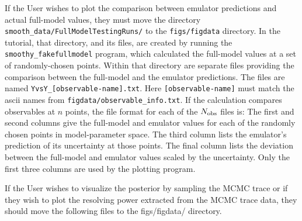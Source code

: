 \documentclass[UserManual.tex]{subfiles}
\begin{document}
\begin{sloppypar}
If the User wishes to plot the comparison between emulator predictions and actual full-model values, they must move the directory {\tt smooth\_data/FullModelTestingRuns/} to the {\tt figs/figdata} directory.
\vspace*{-8pt}{\tt
\begin{Verbatim}[commandchars=\\\{\}]
% \textcolor{darkred}{cp -r \textit{MY_ANALYSIS}/smooth_data/FullModelTestingRuns \textit{MY_ANALYSIS}/figs/figdata/}
\end{Verbatim}
}\vspace*{-8pt}
In the tutorial, that directory, and its files, are created by running  the {\tt smoothy\_fakefullmodel} program, which calculated the full-model values at a set of randomly-chosen points. Within that directory are separate files providing the comparison between the full-model and the emulator predictions. The files are named {\tt YvsY\_[observable-name].txt}. Here {\tt [observable-name]} must match the ascii names from {\tt figdata/observable\_info.txt}. If the calculation compares observables at $n$ points, the file format for each of the $N_{\rm obs}$ files is:
\vspace*{-8pt}{\tt
\begin{Verbatim}
 Y1_full   Y1_emulator emulator_uncertainty_1  accuracy_1
 Y2_full   Y2_emulator emulator_uncertainty_2  accuracy_2
   .
 Yn_full   Yn_emulator emulator_uncertainty_n  accuracy_n
\end{Verbatim}
}\vspace*{-8pt}
The first and second columns give the full-model and emulator values for each of the randomly chosen points in model-parameter space. The third column lists the emulator's prediction of its uncertainty at those points. The final column lists the deviation between the full-model and emulator values scaled by the uncertainty. Only the first three columns are used by the plotting program.

If the User wishes to visualize the posterior by sampling the MCMC trace or if they wish to plot the resolving power extracted from the MCMC trace data, they should move the following files to the {figs/figdata/} directory.
\vspace*{-8pt}{\tt
\begin{Verbatim}[commandchars=\\\{\}]
% \textcolor{darkred}{cp \textit{MY_ANALYSIS}/smooth_data/MCMC/trace_theta.txt \textit{MY_ANALYSIS}/figs/figdata/}
% \textcolor{darkred}{cp \textit{MY_ANALYSIS}/smooth_data/MCMC/ResolvingPower.txt \textit{MY_ANALYSIS}/figs/figdata/}
\end{Verbatim}
}\vspace*{-8pt}


\end{sloppypar}
\end{document}
